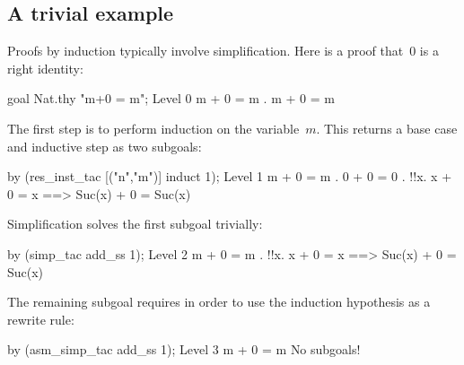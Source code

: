 \subsection{A trivial example}
Proofs by induction typically involve simplification.  Here is a proof
that~0 is a right identity:
\begin{ttbox}
goal Nat.thy "m+0 = m";
{\out Level 0}
{\out m + 0 = m}
{. m + 0 = m}
\end{ttbox}
The first step is to perform induction on the variable~$m$.  This returns a
base case and inductive step as two subgoals:
\begin{ttbox}
by (res_inst_tac [("n","m")] induct 1);
{\out Level 1}
{\out m + 0 = m}
{. 0 + 0 = 0}
{. !!x. x + 0 = x ==> Suc(x) + 0 = Suc(x)}
\end{ttbox}
Simplification solves the first subgoal trivially:
\begin{ttbox}
by (simp_tac add_ss 1);
{\out Level 2}
{\out m + 0 = m}
{. !!x. x + 0 = x ==> Suc(x) + 0 = Suc(x)}
\end{ttbox}
The remaining subgoal requires  in order to use the
induction hypothesis as a rewrite rule:
\begin{ttbox}
by (asm_simp_tac add_ss 1);
{\out Level 3}
{\out m + 0 = m}
{\out No subgoals!}
\end{ttbox}


